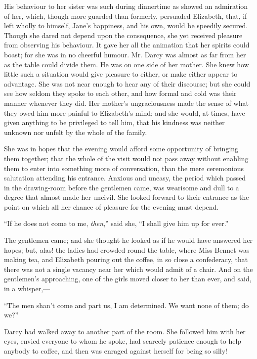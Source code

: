 \documentclass[12pt]{book}
\begin{document}
His behaviour to her sister was such during dinnertime as showed an admiration of her, which, though more guarded than formerly, persuaded Elizabeth, that, if left wholly to himself, Jane's happiness, and his own, would be speedily secured. Though she dared not depend upon the consequence, she yet received pleasure from observing his behaviour. It gave her all the animation that her spirits could boast; for she was in no cheerful humour. Mr. Darcy was almost as far from her as the table could divide them. He was on one side of her mother. She knew how little such a situation would give pleasure to either, or make either appear to advantage. She was not near enough to hear any of their discourse; but she could see how seldom they spoke to each other, and how formal and cold was their manner whenever they did. Her mother's ungraciousness made the sense of what they owed him more painful to Elizabeth's mind; and she would, at times, have given anything to be privileged to tell him, that his kindness was neither unknown nor unfelt by the whole of the family.

She was in hopes that the evening would afford some opportunity of bringing them together; that the whole of the visit would not pass away without enabling them to enter into something more of conversation, than the mere ceremonious salutation attending his entrance. Anxious and uneasy, the period which passed in the drawing-room before the gentlemen came, was wearisome and dull to a degree that almost made her uncivil. She looked forward to their entrance as the point on which all her chance of pleasure for the evening must depend.

``If he does not come to me, \textit{then},'' said she, ``I shall give him up for ever.''

The gentlemen came; and she thought he looked as if he would have answered her hopes; but, alas! the ladies had crowded round the table, where Miss Bennet was making tea, and Elizabeth pouring out the coffee, in so close a confederacy, that there was not a single vacancy near her which would admit of a chair. And on the gentlemen's approaching, one of the girls moved closer to her than ever, and said, in a whisper,---

``The men shan't come and part us, I am determined. We want none of them; do we?''

Darcy had walked away to another part of the room. She followed him with her eyes, envied everyone to whom he spoke, had scarcely patience enough to help anybody to coffee, and then was enraged against herself for being so silly!
\end{document}
